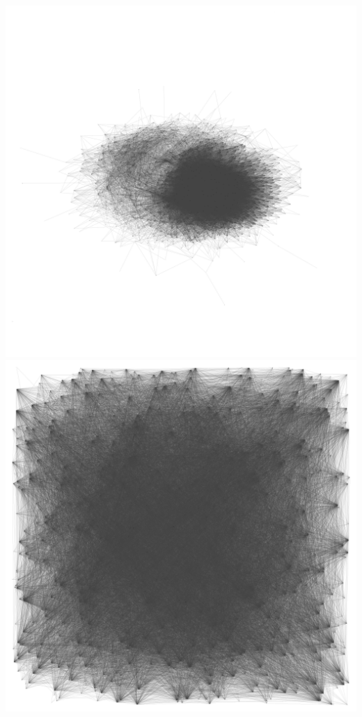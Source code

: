 \documentclass[12pt, a4paper]{article}
\begin{document}
\begin{multicols}{2}
  {\centering
  \includegraphics[width=\columnwidth]{src/youtube/hdg/comp/7_plot_kk}\\
  \label{fig:hdg_c7}}
  {\centering
  \includegraphics[width=\columnwidth]{src/youtube/hdg/comp/8_plot_random}\\
  \label{fig:hdg_c8}}
\end{multicols}
\end{document}
